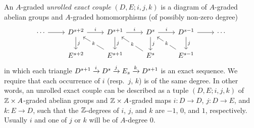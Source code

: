 \documentclass[../main.tex]{subfiles}
\begin{document}
\begin{definition}\label{unrolled_exact_couple}
    An $A$-graded \emph{unrolled exact couple} $(D,E;i,j,k)$ is a diagram of $A$-graded abelian groups and $A$-graded homomorphisms (of possibly non-zero degree)
    \[\begin{tikzcd}
        \cdots & {D^{s+2}} & {D^{s+1}} & {D^{s}} & {D^{s-1}} & \cdots \\
        & {E^{s+2}} & {E^{s+1}} & {E^s} & {E^{s-1}}
        \arrow[from=1-1, to=1-2]
        \arrow["i", from=1-2, to=1-3]
        \arrow["i", from=1-3, to=1-4]
        \arrow["i", from=1-4, to=1-5]
        \arrow[from=1-5, to=1-6]
        \arrow["j", from=1-2, to=2-2]
        \arrow["j", from=1-3, to=2-3]
        \arrow["j", from=1-4, to=2-4]
        \arrow["j", from=1-5, to=2-5]
        \arrow["k"{description}, from=2-3, to=1-2]
        \arrow["k"{description}, from=2-4, to=1-3]
        \arrow["k"{description}, from=2-5, to=1-4]
    \end{tikzcd}\]
    in which each triangle $D^{s+1}\xrightarrow iD^s\xrightarrow jE_s\xrightarrow kD^{s+1}$ is an exact sequence. We require that each occurrence of $i$ (resp.\ $j$, $k$) is of the same degree. In other words, an unrolled exact couple can be described as a tuple $(D,E;i,j,k)$ of $\mathbb{Z}\times A$-graded abelian groups and $\mathbb{Z}\times A$-graded maps $i:D\to D$, $j:D\to E$, and $k:E\to D$, such that the $\mathbb{Z}$-degrees of $i$, $j$, and $k$ are $-1$, $0$, and $1$, respectively. Usually $i$ and one of $j$ or $k$ will be of $A$-degree $0$.
\end{definition}
\end{document}
